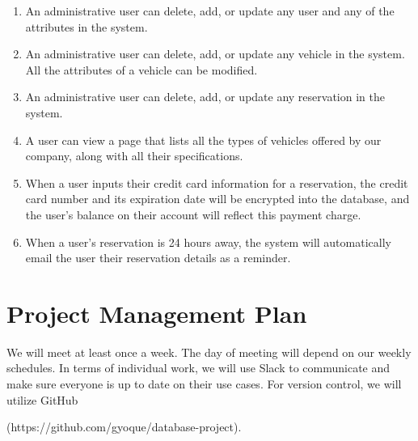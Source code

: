 \documentclass[12pt]{article}
\begin{document}
\begin{enumerate}
\item An administrative user can delete, add, or update any user and any of the attributes in the system.

\item An administrative user can delete, add, or update any vehicle in the system. All the attributes of a vehicle can be modified.

\item An administrative user can delete, add, or update any reservation in the system.

\item A user can view a page that lists all the types of vehicles offered by our company, along with all their specifications.

\item When a user inputs their credit card information for a reservation, the credit card number and its expiration date will be encrypted into the database, and the user's balance on their account will reflect this payment charge.

\item When a user's reservation is 24 hours away, the system will automatically email the user their reservation details as a reminder.

\end{enumerate}

\section{Project Management Plan}

We will meet at least once a week. The day of meeting will depend on our weekly schedules. In terms of individual work, we will use Slack to communicate and make sure everyone is up to date on their use cases. For version control, we will utilize GitHub 

\noindent (https://github.com/gyoque/database-project).
\end{document}
